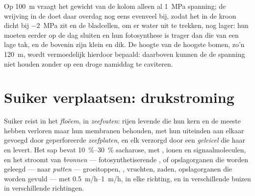 \begin{example}\label{ex:b1:plant-transport:top}
Op \qty{100}{m} vraagt het gewicht van de kolom alleen al \qty{1}{MPa}
spanning; de wrijving in de  doet daar overdag nog eens evenveel bij,
zodat het  in de kroon dicht bij \qty{-2}{MPa} zit en de bladcellen,
om er water uit te trekken, nog lager: hun  moeten eerder op de
dag sluiten en hun fotosynthese is trager dan die van een lage tak, en de
 bovenin zijn klein en dik. De hoogte van de hoogste bomen, zo'n
\qty{120}{m}, wordt vermoedelijk hierdoor bepaald: daarboven kunnen de
 de spanning niet houden zonder op een droge namiddag te caviteren.
\end{example}

\section{Suiker verplaatsen: drukstroming}

\begin{definition}\label{def:b1:plant-transport:phloem}
Suiker reist in het \emph{floëem}, in \emph{zeefvaten}: rijen levende
 die hun kern en de meeste  hebben verloren maar hun
membranen behouden, met hun uiteinden aan elkaar gevoegd door geperforeerde
\emph{zeefplaten}, en elk verzorgd door een \emph{geleicel} die haar
 en  levert. Het sap bevat \qtyrange{10}{30}{\%} sacharose, met
, ionen en signaalmoleculen, en het stroomt van \emph{bronnen}
--- fotosynthetiserende , of opslagorganen die worden geleegd ---
naar \emph{putten} --- groeitoppen, , vruchten, zaden, opslagorganen
die worden gevuld --- met \qtyrange{0.5}{1}{m/h}, in elke richting, en in
verschillende buizen in verschillende richtingen.
\end{definition}

